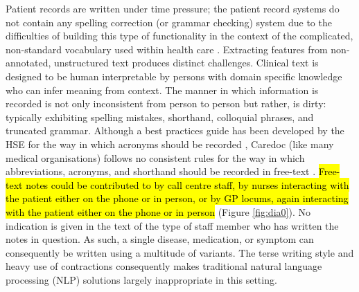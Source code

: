 Patient records are written under time pressure; the patient record systems
do not contain any spelling correction (or grammar checking) system due to the
difficulties of building this type of functionality in the context of the complicated, non-standard
vocabulary used within health care \cite{dalianis2018characteristics}. Extracting features from non-annotated, unstructured text produces distinct challenges. Clinical text is designed to be human interpretable by persons with domain specific knowledge who can infer meaning from context. The manner in which information is recorded is not only inconsistent from person to person but rather, is dirty: typically exhibiting spelling mistakes, shorthand, colloquial phrases, and truncated grammar. Although a best practices guide has been developed by the HSE for the way in which acronyms should be recorded \cite{abbreviations}, Caredoc (like many medical organisations) follows no consistent rules for the way in which abbreviations, acronyms, and shorthand should be recorded in free-text \cite{cunniffe2016developing}. \hl{Free-text notes could be contributed to by call centre staff, by nurses interacting with the patient either on the phone or in person, or by GP locums, again interacting with the patient either on the phone or in person} (Figure \ref{fig:dia0}). No indication is given in the text of the type of staff member who has written the notes in question. As such, a single disease, medication, or symptom can consequently be written using a multitude of variants. The terse writing style and heavy use of contractions consequently makes traditional natural language processing (NLP) solutions largely inappropriate in this setting.







